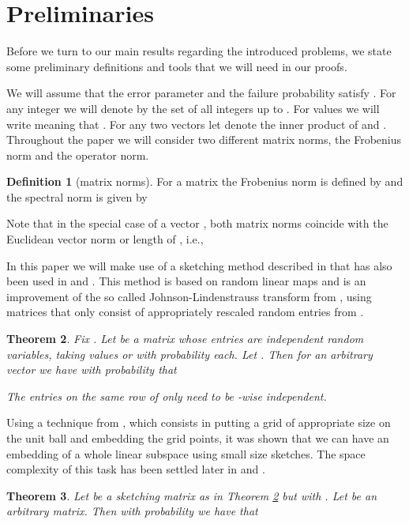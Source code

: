 \documentclass[a4paper,11pt,oneside,english,onecolumn]{article}
\newtheorem{theorem}{Theorem}
\theoremstyle{definition}
\newtheorem{definition}[theorem]{Definition}
\begin{document}
\section{Preliminaries}
\label{prelim}
Before we turn to our main results regarding the introduced problems, we state some preliminary definitions and tools that we will need in our proofs.

We will assume that the error parameter  and the failure probability  satisfy . For any integer  we will denote by  the set of all integers up to . For values  we will write  meaning that . For any two vectors  let  denote the inner product of  and . Throughout the paper we will consider two different matrix norms, the Frobenius norm and the operator norm.

\begin{definition}[matrix norms]
For a matrix  the Frobenius norm is defined by  and the spectral norm is given by 
\end{definition}
Note that in the special case of a vector , both matrix norms coincide with the Euclidean vector norm or length of , i.e., 

In this paper we will make use of a sketching method described in \cite{RandomProj} that has also been used in \cite{ImpLinAlg} and \cite{LinAlgStream}. This method is based on random linear maps and is an improvement of the so called Johnson-Lindenstrauss transform from \cite{JLT}, using matrices that only consist of appropriately rescaled random entries from .

\begin{theorem}
\label{th:sketching}
Fix . Let  be a  matrix whose entries are independent random variables, taking values  or  with probability  each. Let . Then for an arbitrary vector  we have with probability  that

The entries on the same row of  only need to be -wise independent.
\end{theorem}

Using a technique from \cite{ImpLinAlg}, which consists in putting a grid of appropriate size on the unit ball and embedding the grid points, it was shown that we can have an embedding of a whole linear subspace using small size sketches. The space complexity of this task has been settled later in \cite{LinAlgStream} and \cite{NelsonN14}.
\begin{theorem}
\label{th:embedding}
Let  be a  sketching  matrix as in Theorem \ref{th:sketching} but with . Let  be an arbitrary  matrix. Then with probability  we have that

\end{theorem}
\end{document}
